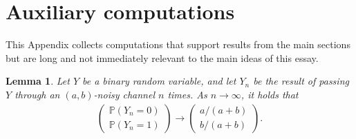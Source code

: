 \documentclass[12pt,reqno]{amsart}
\theoremstyle{plain} %
\newtheorem{lemma}[theorem]{Lemma}
\theoremstyle{remark}
\theoremstyle{definition}
\renewcommand{\P}{\mathbb P}
\begin{document}
\section{Auxiliary computations}

This Appendix collects computations that support results from the main sections but are long and not immediately relevant to the main ideas of this essay.

\begin{lemma}\label{lem: limitingdist}
    Let $Y$ be a binary random variable, and let $Y_n$ be the result of passing $Y$ through an $(a,b)$-noisy channel $n$ times. As $n\to\infty$, it holds that
    \begin{align}
    \begin{pmatrix}
        \P(Y_n=0)\\
        \P(Y_n=1)
    \end{pmatrix}
        \to
        \begin{pmatrix}
            a/(a+b)\\
            b/(a+b)
        \end{pmatrix}.
    \end{align}
\end{lemma}
\end{document}

